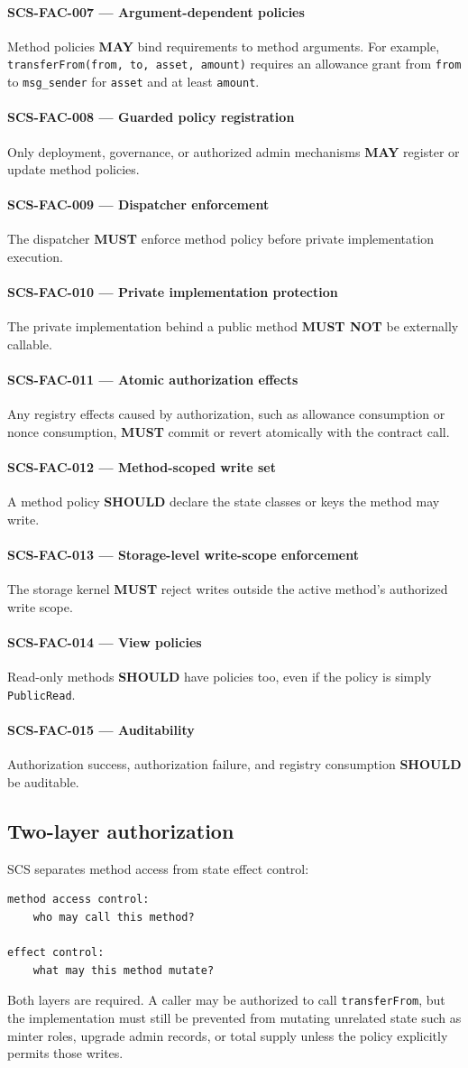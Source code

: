 \documentclass[11pt]{article}
\newcommand{\SCS}{\textsc{SCS}}
\newcommand{\MUST}{\textbf{MUST}}
\newcommand{\MUSTNOT}{\textbf{MUST NOT}}
\newcommand{\SHOULD}{\textbf{SHOULD}}
\newcommand{\MAY}{\textbf{MAY}}
\newcommand{\req}[2]{\paragraph{#1}#2\par}
\newcommand{\code}[1]{\texttt{#1}}
\begin{document}
\req{SCS-FAC-007 --- Argument-dependent policies}{Method policies \MAY{} bind requirements to method arguments. For example, \code{transferFrom(from, to, asset, amount)} requires an allowance grant from \code{from} to \code{msg\_sender} for \code{asset} and at least \code{amount}.}

\req{SCS-FAC-008 --- Guarded policy registration}{Only deployment, governance, or authorized admin mechanisms \MAY{} register or update method policies.}

\req{SCS-FAC-009 --- Dispatcher enforcement}{The dispatcher \MUST{} enforce method policy before private implementation execution.}

\req{SCS-FAC-010 --- Private implementation protection}{The private implementation behind a public method \MUSTNOT{} be externally callable.}

\req{SCS-FAC-011 --- Atomic authorization effects}{Any registry effects caused by authorization, such as allowance consumption or nonce consumption, \MUST{} commit or revert atomically with the contract call.}

\req{SCS-FAC-012 --- Method-scoped write set}{A method policy \SHOULD{} declare the state classes or keys the method may write.}

\req{SCS-FAC-013 --- Storage-level write-scope enforcement}{The storage kernel \MUST{} reject writes outside the active method's authorized write scope.}

\req{SCS-FAC-014 --- View policies}{Read-only methods \SHOULD{} have policies too, even if the policy is simply \code{PublicRead}.}

\req{SCS-FAC-015 --- Auditability}{Authorization success, authorization failure, and registry consumption \SHOULD{} be auditable.}

\subsection{Two-layer authorization}

\SCS{} separates method access from state effect control:

\begin{lstlisting}
method access control:
    who may call this method?

effect control:
    what may this method mutate?
\end{lstlisting}

Both layers are required. A caller may be authorized to call \code{transferFrom}, but the implementation must still be prevented from mutating unrelated state such as minter roles, upgrade admin records, or total supply unless the policy explicitly permits those writes.
\end{document}

